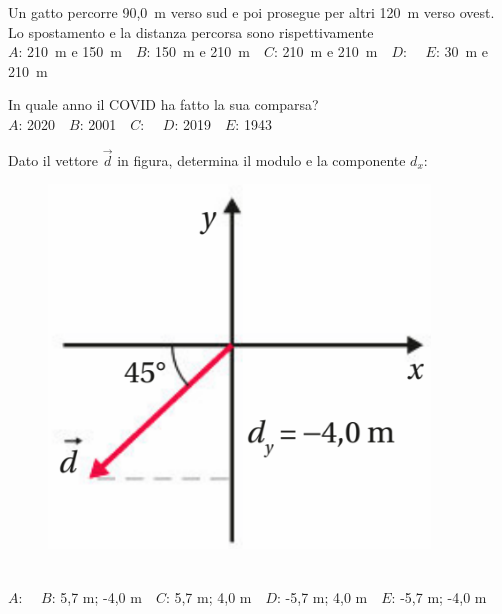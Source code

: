 \mcquestionfooter



\mcpaperfooter

\def\mcserialnumber{38}
\mcpaperheader


\def\mcquestionnumber{1}


\mcquestionheader Un gatto percorre 90,0~m verso sud e poi prosegue per altri 120~m verso ovest. Lo spostamento e la distanza percorsa sono rispettivamente\\
{$A$}: 210~m e 150~m\ \ {$B$}: 150~m e 210~m\ \ {$C$}: 210~m e 210~m\ \ {$D$}: \ \ {$E$}: 30~m e 210~m\ \ 

\mcquestionfooter



\def\mcquestionnumber{2}


\mcquestionheader In quale anno il COVID ha fatto la sua comparsa?\\
{$A$}: 2020\ \ {$B$}: 2001\ \ {$C$}: \ \ {$D$}: 2019\ \ {$E$}: 1943\ \ 

\mcquestionfooter



\def\mcquestionnumber{3}


\mcquestionheader Dato il vettore $\vec{d}$ in figura, determina il modulo e la componente $d_x$: \begin{figure}[h!]   \begin{center}     \includegraphics[scale=0.35]{vettored.png}   \end{center} \end{figure}\\
{$A$}: \ \ {$B$}: 5,7 m; -4,0 m\ \ {$C$}: 5,7 m; 4,0 m\ \ {$D$}: -5,7 m; 4,0 m\ \ {$E$}: -5,7 m; -4,0 m\ \ 

